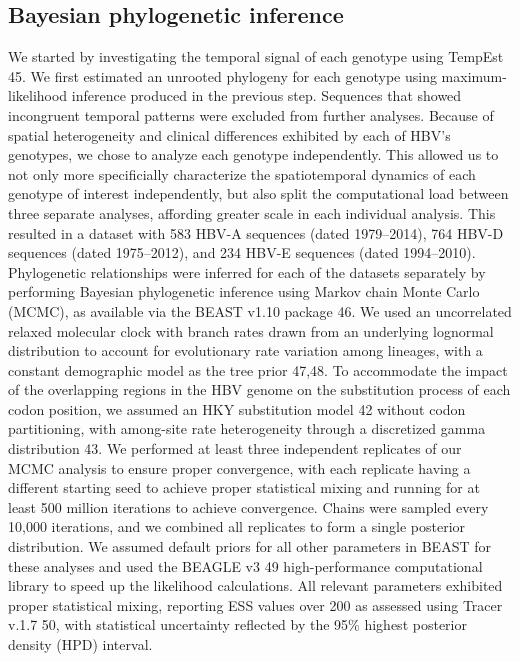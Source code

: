 \subsection{Bayesian phylogenetic inference}
We started by investigating the temporal signal of each genotype using TempEst 45. We first estimated an unrooted phylogeny for each genotype using maximum-likelihood inference produced in the previous step. Sequences that showed incongruent temporal patterns were excluded from further analyses. Because of spatial heterogeneity and clinical differences exhibited by each of HBV's genotypes, we chose to analyze each genotype independently. This allowed us to not only more specificially characterize the spatiotemporal dynamics of each genotype of interest independently, but also split the computational load between three separate analyses, affording greater scale in each individual analysis. This resulted in a dataset with 583 HBV-A sequences (dated 1979--2014), 764 HBV-D sequences (dated 1975--2012), and 234 HBV-E sequences (dated 1994--2010). Phylogenetic relationships were inferred for each of the datasets separately by performing Bayesian phylogenetic inference using Markov chain Monte Carlo (MCMC), as available via the BEAST v1.10 package 46. We used an uncorrelated relaxed molecular clock with branch rates drawn from an underlying lognormal distribution to account for evolutionary rate variation among lineages, with a constant demographic model as the tree prior 47,48. To accommodate the impact of the overlapping regions in the HBV genome on the substitution process of each codon position, we assumed an HKY substitution model 42 without codon partitioning, with among-site rate heterogeneity through a discretized gamma distribution 43. We performed at least three independent replicates of our MCMC analysis to ensure proper convergence, with each replicate having a different starting seed to achieve proper statistical mixing and running for at least 500 million iterations to achieve convergence. Chains were sampled every 10,000 iterations, and we combined all replicates to form a single posterior distribution. We assumed default priors for all other parameters in BEAST for these analyses and used the BEAGLE v3 49 high-performance computational library to speed up the likelihood calculations. All relevant parameters exhibited proper statistical mixing, reporting ESS values over 200 as assessed using Tracer v.1.7 50, with statistical uncertainty reflected by the 95\% highest posterior density (HPD) interval.\\

